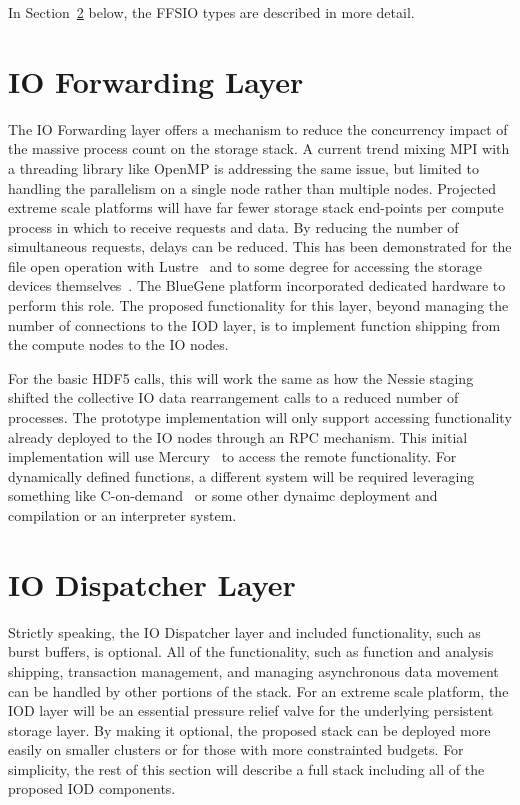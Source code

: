 \documentclass[conference]{IEEEtran}
\begin{document}
In Section~\ref{sec:iod} below, the FFSIO types are described in more detail.

\section{IO Forwarding Layer}
\label{sec:iof}

The IO Forwarding layer offers a mechanism to reduce the concurrency impact of
the massive process count on the storage stack. A current trend mixing MPI with
a threading library like OpenMP is addressing the same issue, but limited to
handling the parallelism on a single node rather than multiple nodes. Projected
extreme scale platforms will have far fewer storage stack end-points per
compute process in which to receive requests and data. By reducing the number
of simultaneous requests, delays can be reduced. This has been demonstrated for
the file open operation with Lustre~\cite{lofstead:2009:adaptable} and to some
degree for accessing the storage devices
themselves~\cite{lofstead:2010:io-variability}.  The BlueGene platform
incorporated dedicated hardware to perform this role. The proposed
functionality for this layer, beyond managing the number of connections to the
IOD layer, is to implement function shipping from the compute nodes to the IO
nodes.

For the basic HDF5 calls, this will work the same as how the Nessie
staging~\cite{lofstead:2011:nessie-staging} shifted the collective IO data
rearrangement calls to a reduced number of processes. The prototype
implementation will only support accessing functionality already deployed to
the IO nodes through an RPC mechanism. This initial implementation will use
Mercury~\cite{Soumagne:2013:mercury} to access the remote functionality. For
dynamically defined functions, a different system will be required leveraging
something like C-on-demand~\cite{abbasi:2011:c-on-demand} or some other dynaimc
deployment and compilation or an interpreter system.

\section{IO Dispatcher Layer}
\label{sec:iod}

Strictly speaking, the IO Dispatcher layer and included functionality, such as
burst buffers, is optional. All of the functionality, such as function and
analysis shipping, transaction management, and managing asynchronous data
movement can be handled by other portions of the stack. For an extreme scale
platform, the IOD layer will be an essential pressure relief valve for the
underlying persistent storage layer. By making it optional, the proposed stack
can be deployed more easily on smaller clusters or for those with more
constrainted budgets. For simplicity, the rest of this section will describe a
full stack including all of the proposed IOD components.
\end{document}
